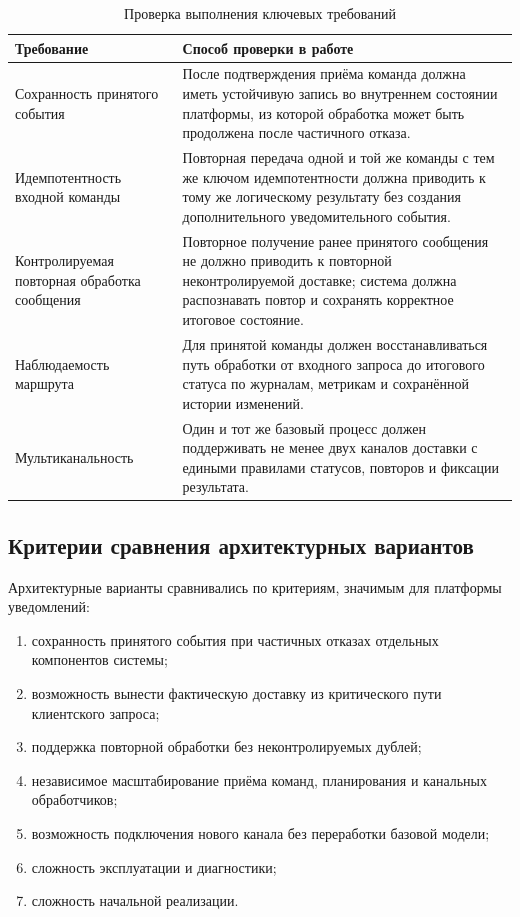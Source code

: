 \begin{table}[H]
    \centering
    \footnotesize
    \renewcommand{\arraystretch}{1.15}
    \caption{Проверка выполнения ключевых требований}
    \label{tab:nfr-validation}
    \begin{tabular}{|L{0.34\textwidth}|L{0.54\textwidth}|}
        \hline
        \textbf{Требование} & \textbf{Способ проверки в работе} \\
        \hline
        Сохранность принятого события & После подтверждения приёма команда должна иметь устойчивую запись во внутреннем состоянии платформы, из которой обработка может быть продолжена после частичного отказа. \\
        \hline
        Идемпотентность входной команды & Повторная передача одной и той же команды с тем же ключом идемпотентности должна приводить к тому же логическому результату без создания дополнительного уведомительного события. \\
        \hline
        Контролируемая повторная обработка сообщения & Повторное получение ранее принятого сообщения не должно приводить к повторной неконтролируемой доставке; система должна распознавать повтор и сохранять корректное итоговое состояние. \\
        \hline
        Наблюдаемость маршрута & Для принятой команды должен восстанавливаться путь обработки от входного запроса до итогового статуса по журналам, метрикам и сохранённой истории изменений. \\
        \hline
        Мультиканальность & Один и тот же базовый процесс должен поддерживать не менее двух каналов доставки с едиными правилами статусов, повторов и фиксации результата. \\
        \hline
    \end{tabular}
\end{table}

\subsection{Критерии сравнения архитектурных вариантов}

Архитектурные варианты сравнивались по критериям, значимым для платформы уведомлений:
\begin{enumerate}
    \item сохранность принятого события при частичных отказах отдельных компонентов системы;
    \item возможность вынести фактическую доставку из критического пути клиентского запроса;
    \item поддержка повторной обработки без неконтролируемых дублей;
    \item независимое масштабирование приёма команд, планирования и канальных обработчиков;
    \item возможность подключения нового канала без переработки базовой модели;
    \item сложность эксплуатации и диагностики;
    \item сложность начальной реализации.
\end{enumerate}

